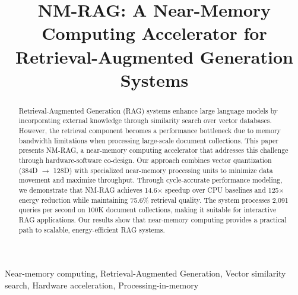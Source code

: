 \documentclass[conference]{IEEEtran}
\begin{document}
\title{NM-RAG: A Near-Memory Computing Accelerator for Retrieval-Augmented Generation Systems}

\author{
\and
{}
\and
{}
}

\maketitle

\begin{abstract}
Retrieval-Augmented Generation (RAG) systems enhance large language models by incorporating external knowledge through similarity search over vector databases. However, the retrieval component becomes a performance bottleneck due to memory bandwidth limitations when processing large-scale document collections. This paper presents NM-RAG, a near-memory computing accelerator that addresses this challenge through hardware-software co-design. Our approach combines vector quantization (384D $\rightarrow$ 128D) with specialized near-memory processing units to minimize data movement and maximize throughput. Through cycle-accurate performance modeling, we demonstrate that NM-RAG achieves 14.6$\times$ speedup over CPU baselines and 125$\times$ energy reduction while maintaining 75.6\% retrieval quality. The system processes 2,091 queries per second on 100K document collections, making it suitable for interactive RAG applications. Our results show that near-memory computing provides a practical path to scalable, energy-efficient RAG systems.
\end{abstract}

\begin{IEEEkeywords}
Near-memory computing, Retrieval-Augmented Generation, Vector similarity search, Hardware acceleration, Processing-in-memory
\end{IEEEkeywords}
\end{document}
